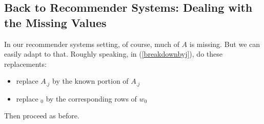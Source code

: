 \subsection{Back to Recommender Systems:  Dealing with the Missing Values}

In our recommender systems setting, of course, much of $A$ is missing.
But we can easily adapt to that.  Roughly speaking, in
(\ref{breakdownbyj}), do these replacements:

\begin{itemize}

\item replace $A_{.j}$ by the known portion of $A_{.j}$

\item replace $_0$ by the corresponding rows of $w_0$

\end{itemize} 

Then proceed as before.  

% 
% 
% 
% 
% 
% 
% 
% 
% 


